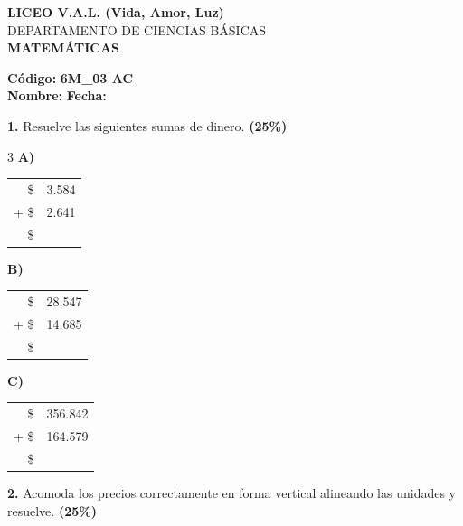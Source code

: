 \documentclass[12pt, letterpaper]{article}
\newcommand{\boxfill}[1][1.5cm]{\tcbox[on line, size=minimal, colframe=black, colback=white, boxrule=0.5pt, arc=1mm, boxsep=3pt, left=2pt, right=2pt, top=2pt, bottom=2pt]{\hspace*{#1}\vphantom{M}}}
\begin{document}
	
	\begin{center}
		{\Large \textbf{LICEO V.A.L. (Vida, Amor, Luz)}}\\[0.1cm]
		{\large DEPARTAMENTO DE CIENCIAS BÁSICAS}\\[0.1cm]
		\textbf{MATEMÁTICAS}\\[0.1cm]
	\end{center}
	
	\vspace{0.3cm}
	
	\hfill \textbf{Código:} \textbf{6M\_03 AC}\\
	
	\noindent \textbf{Nombre:} \underline{\hspace{8cm}} \hspace{1cm}\textbf{Fecha:} \underline{\hspace{3cm}}
	
	\vspace{0.8cm}
	
	\noindent \textbf{1.} Resuelve las siguientes sumas de dinero. \textbf{(25\%)}
	
	\vspace{0.5cm}
	\begin{multicols}{3}
		\textbf{A)}\\
		\begin{tabular}{rr}
			\$ & 3.584 \\
			+ \$ & 2.641 \\
			\hline
			\$ & \boxfill[1.5cm]
		\end{tabular}
		
		\textbf{B)}\\
		\begin{tabular}{rr}
			\$ & 28.547 \\
			+ \$ & 14.685 \\
			\hline
			\$ & \boxfill[1.5cm]
		\end{tabular}
		
		\textbf{C)}\\
		\begin{tabular}{rr}
			\$ & 356.842 \\
			+ \$ & 164.579 \\
			\hline
			\$ & \boxfill[1.5cm]
		\end{tabular}
	\end{multicols}
	
	\vspace{0.8cm}
	
	\noindent \textbf{2.} Acomoda los precios correctamente en forma vertical alineando las unidades y resuelve. \textbf{(25\%)}
	
\end{document}
